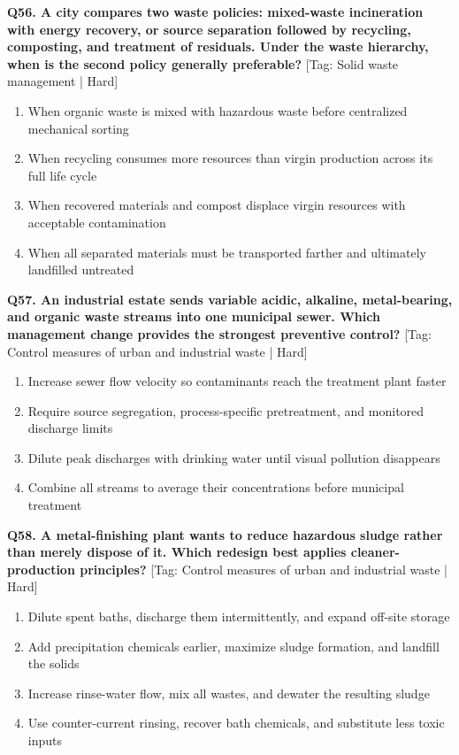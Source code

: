 \noindent\textbf{Q56. A city compares two waste policies: mixed-waste incineration with energy recovery, or source separation followed by recycling, composting, and treatment of residuals. Under the waste hierarchy, when is the second policy generally preferable?} \hfill [Tag: Solid waste management | Hard]
\begin{enumerate}[label=(\alph*),topsep=2pt,itemsep=1pt,partopsep=0pt,parsep=0pt]
    \item {When organic waste is mixed with hazardous waste before centralized mechanical sorting}
    \item {When recycling consumes more resources than virgin production across its full life cycle}
    \item {When recovered materials and compost displace virgin resources with acceptable contamination}
    \item {When all separated materials must be transported farther and ultimately landfilled untreated}
\end{enumerate}
\vspace{2mm}

\noindent\textbf{Q57. An industrial estate sends variable acidic, alkaline, metal-bearing, and organic waste streams into one municipal sewer. Which management change provides the strongest preventive control?} \hfill [Tag: Control measures of urban and industrial waste | Hard]
\begin{enumerate}[label=(\alph*),topsep=2pt,itemsep=1pt,partopsep=0pt,parsep=0pt]
    \item {Increase sewer flow velocity so contaminants reach the treatment plant faster}
    \item {Require source segregation, process-specific pretreatment, and monitored discharge limits}
    \item {Dilute peak discharges with drinking water until visual pollution disappears}
    \item {Combine all streams to average their concentrations before municipal treatment}
\end{enumerate}
\vspace{2mm}

\noindent\textbf{Q58. A metal-finishing plant wants to reduce hazardous sludge rather than merely dispose of it. Which redesign best applies cleaner-production principles?} \hfill [Tag: Control measures of urban and industrial waste | Hard]
\begin{enumerate}[label=(\alph*),topsep=2pt,itemsep=1pt,partopsep=0pt,parsep=0pt]
    \item {Dilute spent baths, discharge them intermittently, and expand off-site storage}
    \item {Add precipitation chemicals earlier, maximize sludge formation, and landfill the solids}
    \item {Increase rinse-water flow, mix all wastes, and dewater the resulting sludge}
    \item {Use counter-current rinsing, recover bath chemicals, and substitute less toxic inputs}
\end{enumerate}
\vspace{2mm}


